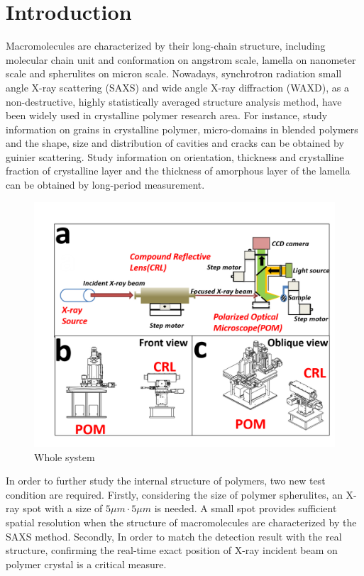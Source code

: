 \documentclass{Head}
\begin{document}
\tableofcontents
\linenumbers
\section{Introduction}
Macromolecules are characterized by their long-chain structure, including molecular chain unit and conformation on angstrom scale, lamella on nanometer scale and spherulites on micron scale.
Nowadays, synchrotron radiation small angle X-ray scattering (SAXS) and wide angle X-ray diffraction (WAXD), as a non-destructive, highly statistically averaged structure analysis method, have been widely used in crystalline polymer research area.
For instance, study information on grains in crystalline polymer, micro-domains in blended polymers and the shape, size and distribution of cavities and cracks can be obtained by guinier scattering.
Study information on orientation, thickness and crystalline fraction of crystalline layer and the thickness of amorphous layer of the lamella can be obtained by long-period measurement.
\begin{figure}
    \centering
    \includegraphics[scale=0.5]{Figures/Fig1WholeSystem.png}
    \caption{Whole system}
    \label{WholeSystem}
\end{figure}


In order to further study the internal structure of polymers, two new test condition are required.
Firstly, considering the size of polymer spherulites, an X-ray spot with a size of $5\mu m \cdot 5\mu m$ is needed.
A small spot provides sufficient spatial resolution when the structure of macromolecules are characterized by the SAXS method.
Secondly, In order to match the detection result with the real structure, confirming the real-time exact position of X-ray incident beam on polymer crystal is a critical measure.
\end{document}
